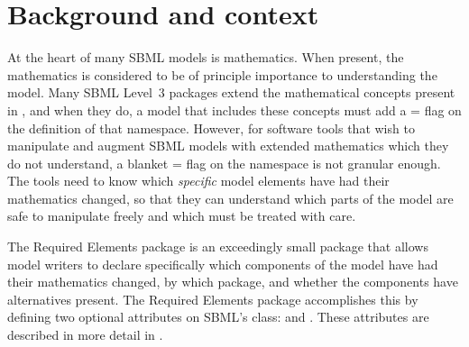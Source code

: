 
\section{Background and context}
\label{background}

At the heart of many SBML models is mathematics. When present, the mathematics is considered to be of principle importance to understanding the model. Many SBML Level~3 packages extend the mathematical concepts present in \sbmlthreecore, and when they do, a model that includes these concepts must add a = flag on the definition of that namespace.  However, for software tools that wish to manipulate and augment SBML models with extended mathematics which they do not understand, a blanket = flag on the namespace is not granular enough.  The tools need to know which \emph{specific} model elements have had their mathematics changed, so that they can understand which parts of the model are safe to manipulate freely and which must be treated with care.

The Required Elements package is an exceedingly small package that allows model writers to declare specifically which components of the model have had their mathematics changed, by which package, and whether the components have \sbmlthreecore alternatives present.  The Required Elements package accomplishes this by defining two optional attributes on SBML's \SBase class:  and .  These attributes are described in more detail in .

